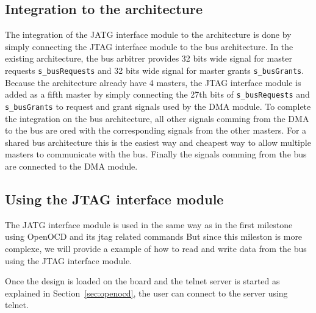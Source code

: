 \documentclass[a4paper,11pt,oneside]{report}
\begin{document}
\subsection{Integration to the architecture}

The integration of the JATG interface module to the architecture is done by simply connecting the JTAG interface module to the bus architecture.
In the existing architecture, the bus arbitrer provides 32 bits wide signal for master requests \texttt{s\_busRequests} and 32 bits wide signal for master grants \texttt{s\_busGrants}.
Because the architecture already have 4 masters, the JTAG interface module is added as a fifth master by simply connecting the 27th bits of \texttt{s\_busRequests} and \texttt{s\_busGrants} 
to request and grant signals used by the DMA module.
To complete the integration on the bus architecture, all other signals comming from the DMA to the bus are ored with the corresponding signals from the other masters. For 
a shared bus architecture this is the easiest way and cheapest way to allow multiple masters to communicate with the bus.
Finally the signals comming from the bus are connected to the DMA module.

\subsection{Using the JTAG interface module}

The JATG interface module is used in the same way as in the first milestone using OpenOCD and its jtag related commands
But since this mileston is more complexe, we will provide a example of how to read and write data from the bus using the JTAG interface module.

Once the design is loaded on the board and the telnet server is started as explained in Section~\ref{sec:openocd}, the user can connect to the server using telnet.
\end{document}
